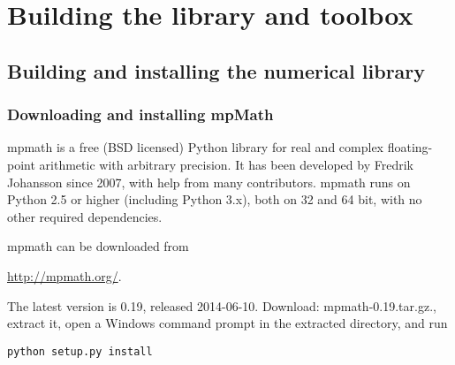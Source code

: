 %
%
%
%
%
%
%





\chapter{Building the library and toolbox} 


\section{Building and installing the numerical library}



\subsection{Downloading and installing mpMath}

mpmath is a free (BSD licensed) Python library for real and complex floating-point arithmetic with arbitrary precision. It has been developed by Fredrik Johansson since 2007, with help from many contributors. mpmath runs on Python 2.5 or higher (including Python 3.x), both on 32 and 64 bit, with no other required dependencies.

mpmath can be downloaded from

\vpara
\href{http://mpmath.org/}{http://mpmath.org/}.

The latest version is 0.19, released 2014-06-10. Download: mpmath-0.19.tar.gz., extract it, open a Windows command prompt in the extracted directory, and run
\begin{verbatim}
python setup.py install
\end{verbatim}


